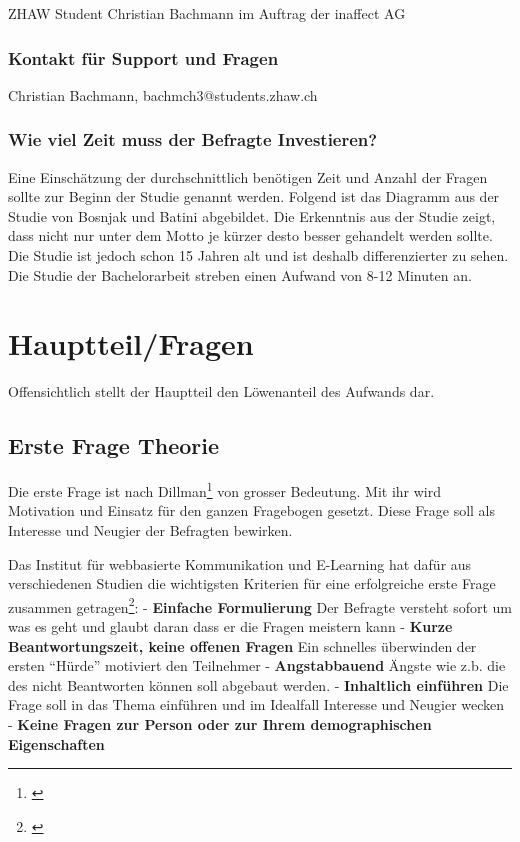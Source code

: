 ZHAW Student Christian Bachmann im Auftrag der inaffect AG

\subsubsection{Kontakt für Support und
Fragen}\label{kontakt-fuxfcr-support-und-fragen}

Christian Bachmann, bachmch3@students.zhaw.ch

\subsubsection{Wie viel Zeit muss der Befragte
Investieren?}\label{wie-viel-zeit-muss-der-befragte-investieren}

Eine Einschätzung der durchschnittlich benötigen Zeit und Anzahl der
Fragen sollte zur Beginn der Studie genannt werden. Folgend ist das
Diagramm aus der Studie von Bosnjak und Batini abgebildet. Die
Erkenntnis aus der Studie zeigt, dass nicht nur unter dem Motto je
kürzer desto besser gehandelt werden sollte. Die Studie ist jedoch schon
15 Jahren alt und ist deshalb differenzierter zu sehen. Die Studie der
Bachelorarbeit streben einen Aufwand von 8-12 Minuten an.

\newpage

\section{Hauptteil/Fragen}\label{hauptteilfragen}

Offensichtlich stellt der Hauptteil den Löwenanteil des Aufwands dar.

\subsection{Erste Frage Theorie}\label{erste-frage-theorie}

Die erste Frage ist nach Dillman\footnote{\autocite{dillman}} von
grosser Bedeutung. Mit ihr wird Motivation und Einsatz für den ganzen
Fragebogen gesetzt. Diese Frage soll als Interesse und Neugier der
Befragten bewirken.

Das Institut für webbasierte Kommunikation und E-Learning hat dafür aus
verschiedenen Studien die wichtigsten Kriterien für eine erfolgreiche
erste Frage zusammen getragen\footnote{\autocite{fragebogen}}: -
\textbf{Einfache Formulierung} Der Befragte versteht sofort um was es
geht und glaubt daran dass er die Fragen meistern kann - \textbf{Kurze
Beantwortungszeit, keine offenen Fragen} Ein schnelles überwinden der
ersten ``Hürde'' motiviert den Teilnehmer - \textbf{Angstabbauend}
Ängste wie z.b. die des nicht Beantworten können soll abgebaut werden. -
\textbf{Inhaltlich einführen} Die Frage soll in das Thema einführen und
im Idealfall Interesse und Neugier wecken - \textbf{Keine Fragen zur
Person oder zur Ihrem demographischen Eigenschaften}

